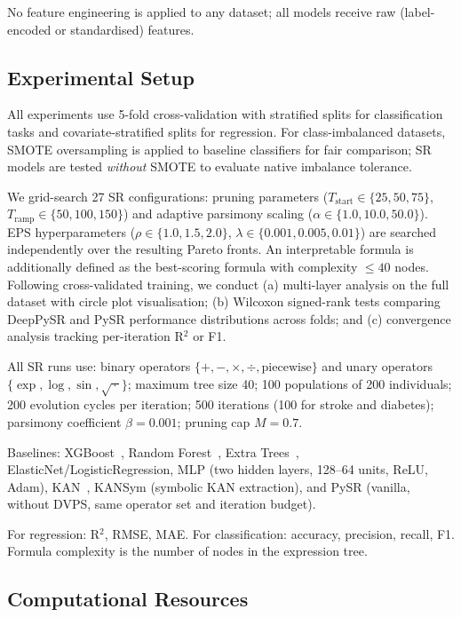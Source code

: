 \documentclass[10pt,twocolumn]{article}
\begin{document}
No feature engineering is applied to any dataset; all models receive raw
(label-encoded or standardised) features.

\subsection{Experimental Setup}
\label{sec:setup}

All experiments use 5-fold cross-validation with stratified splits for
classification tasks and covariate-stratified splits for regression.  For
class-imbalanced datasets, SMOTE oversampling is applied to baseline classifiers
for fair comparison; SR models are tested \emph{without} SMOTE to evaluate
native imbalance tolerance.

We grid-search 27 SR configurations: pruning parameters
($T_{\mathrm{start}} \in \{25, 50, 75\}$, $T_{\mathrm{ramp}} \in \{50,
100, 150\}$) and adaptive parsimony scaling ($\alpha \in \{1.0, 10.0, 50.0\}$).
EPS hyperparameters ($\rho \in \{1.0, 1.5, 2.0\}$, $\lambda \in \{0.001,
0.005, 0.01\}$) are searched independently over the resulting Pareto fronts.
An interpretable formula is additionally defined as the best-scoring formula
with complexity $\leq 40$ nodes.  Following cross-validated training, we
conduct (a) multi-layer analysis on the full dataset with circle plot
visualisation; (b) Wilcoxon signed-rank tests comparing DeepPySR and PySR
performance distributions across folds; and (c) convergence analysis tracking
per-iteration R$^2$ or F1.

All SR runs use: binary operators $\{+, -, \times, \div, \mathrm{piecewise}\}$
and unary operators $\{\exp, \log, \sin, \sqrt{\,\cdot\,}\}$; maximum tree size
40; 100 populations of 200 individuals; 200 evolution cycles per iteration; 500
iterations (100 for stroke and diabetes); parsimony coefficient $\beta = 0.001$;
pruning cap $M = 0.7$.

Baselines: XGBoost~\citep{chen2016xgboost}, Random
Forest~\citep{breiman2001random}, Extra Trees~\citep{geurts2006extremely},
ElasticNet/LogisticRegression, MLP (two hidden layers, 128–64 units, ReLU,
Adam), KAN~\citep{liu2024kan}, KANSym (symbolic KAN extraction), and PySR
(vanilla, without DVPS, same operator set and iteration budget).

For regression: R$^2$, RMSE, MAE.  For classification: accuracy, precision,
recall, F1.  Formula complexity is the number of nodes in the expression tree.

\subsection{Computational Resources}
\label{sec:compute}
\end{document}
